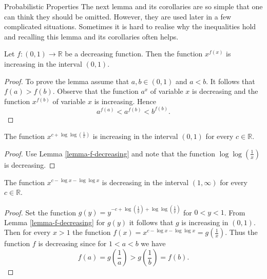 \begin{section}{Probabilistic Properties}
The next lemma and its corollaries are so simple that one can think they should be omitted. However, they are used later in a few complicated situations. Sometimes it is hard to realise why the inequalities hold and recalling this lemma and its corollaries often helps.
\begin{lemma}
\label{lemma-f-decreasing}
Let $f: (0, 1) \rightarrow \mathbb{R}$ be a decreasing function. Then the function $x ^ {f(x)}$ is increasing in the interval $(0, 1)$.
\end{lemma}
\begin{proof}
To prove the lemma assume that $a, b \in (0, 1)$ and $a < b$. It follows that $f(a) > f(b)$. Observe that the function $a ^ x$ of variable $x$ is decreasing and the function $x ^ {f(b)}$ of variable $x$ is increasing. Hence
\[
a ^ {f(a)} < a ^ {f(b)} < b ^ {f(b)} \text{.}
\]
\end{proof}

\begin{corollary}
\label{corollary-f0}
The function $x ^ {c + \log \log \left(\frac{1}{x}\right)}$ is increasing in the interval $(0, 1)$ for every $c \in \mathbb{R}$.
\end{corollary}
\begin{proof}
Use Lemma \ref{lemma-f-decreasing} and note that the function $\log \log \left(\frac{1}{x}\right)$ is decreasing.
\end{proof}

\begin{corollary}
\label{corollary-f1}
The function $x ^ {c - \log x - \log \log x}$ is decreasing in the interval $(1, \infty)$ for every $c \in \mathbb{R}$.
\end{corollary}
\begin{proof}
Set the function $g(y) = y ^ {-c + \log \left(\frac{1}{y}\right) + \log \log \left(\frac{1}{y}\right)}$ for $0 < y < 1$. From Lemma \ref{lemma-f-decreasing} for $g(y)$ it follows that $g$ is increasing in $(0, 1)$. Then for every $x > 1$ the function $f(x) = x ^ {c - \log x - \log \log x} = g\left(\frac{1}{x}\right)$. Thus the function $f$ is decreasing since for $1 < a < b$ we have
\[
	f(a) = g\left(\frac{1}{a}\right) > g\left(\frac{1}{b}\right) = f(b) \text{.}
\] 
\end{proof}


\end{section}

